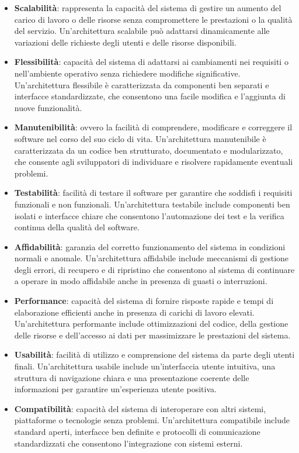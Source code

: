 \begin{itemize}
	\item \textbf{Scalabilità}: rappresenta la capacità del sistema di gestire un aumento del carico di lavoro o delle risorse senza compromettere le prestazioni o la qualità del servizio. Un'architettura scalabile può adattarsi dinamicamente alle variazioni delle richieste degli utenti e delle risorse disponibili.
	\item \textbf{Flessibilità}: capacità del sistema di adattarsi ai cambiamenti nei requisiti o nell'ambiente operativo senza richiedere modifiche significative. Un'architettura flessibile è caratterizzata da componenti ben separati e interfacce standardizzate, che consentono una facile modifica e l'aggiunta di nuove funzionalità.
	\item \textbf{Manutenibilità}: ovvero la facilità di comprendere, modificare e correggere il software nel corso del suo ciclo di vita. Un'architettura manutenibile è caratterizzata da un codice ben strutturato, documentato e modularizzato, che consente agli sviluppatori di individuare e risolvere rapidamente eventuali problemi.
	\item \textbf{Testabilità}: facilità di testare il software per garantire che soddisfi i requisiti funzionali e non funzionali. Un'architettura testabile include componenti ben isolati e interfacce chiare che consentono l'automazione dei test e la verifica continua della qualità del software.
	\item \textbf{Affidabilità}: garanzia del corretto funzionamento del sistema in condizioni normali e anomale. Un'architettura affidabile include meccanismi di gestione degli errori, di recupero e di ripristino che consentono al sistema di continuare a operare in modo affidabile anche in presenza di guasti o interruzioni.
	\item \textbf{Performance}: capacità del sistema di fornire risposte rapide e tempi di elaborazione efficienti anche in presenza di carichi di lavoro elevati. Un'architettura performante include ottimizzazioni del codice, della gestione delle risorse e dell'accesso ai dati per massimizzare le prestazioni del sistema.
	\item \textbf{Usabilità}: facilità di utilizzo e comprensione del sistema da parte degli utenti finali. Un'architettura usabile include un'interfaccia utente intuitiva, una struttura di navigazione chiara e una presentazione coerente delle informazioni per garantire un'esperienza utente positiva.
	\item \textbf{Compatibilità}: capacità del sistema di interoperare con altri sistemi, piattaforme o tecnologie senza problemi. Un'architettura compatibile include standard aperti, interfacce ben definite e protocolli di comunicazione standardizzati che consentono l'integrazione con sistemi esterni.

\end{itemize}
